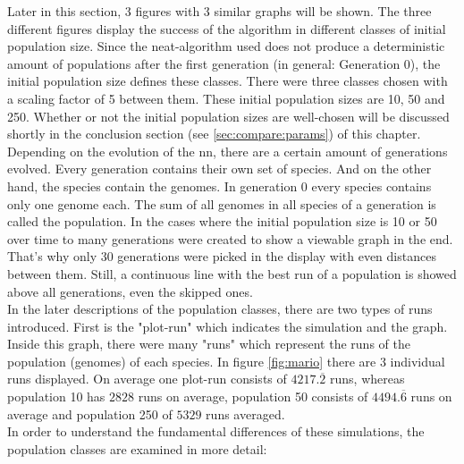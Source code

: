 		Later in this section, 3 figures with 3 similar graphs will be shown. The three different figures display the success of the algorithm in different classes of initial population size. Since the \gls{neat}-algorithm used does not produce a deterministic amount of populations after the first generation (in general: Generation 0), the initial population size defines these classes. There were three classes chosen with a scaling factor of 5 between them. These initial population sizes are 10, 50 and 250. Whether or not the initial population sizes are well-chosen will be discussed shortly in the conclusion section (see \ref{sec:compare:params}) of this chapter. Depending on the evolution of the \gls{nn}, there are a certain amount of generations evolved. Every generation contains their own set of species. And on the other hand, the species contain the genomes. In generation 0 every species contains only one genome each. The sum of all genomes in all species of a generation is called the population. In the cases where the initial population size is 10 or 50 over time to many generations were created to show a viewable graph in the end. That's why only 30 generations were picked in the display with even distances between them. Still, a continuous line with the best run of a population is showed above all generations, even the skipped ones. \\
		In the later descriptions of the population classes, there are two types of runs introduced. First is the "plot-run" which indicates the simulation and the graph. Inside this graph, there were many "runs" which represent the runs of the population (genomes) of each species. In figure \ref{fig:mario} there are 3 individual runs displayed. On average one plot-run consists of $4217.\overline{2}$ runs, whereas population 10 has $2828$ runs on average, population 50 consists of $4494.\overline{6}$ runs on average and population 250 of $5329$ runs averaged.\\
		In order to understand the fundamental differences of these simulations, the population classes are examined in more detail: 
